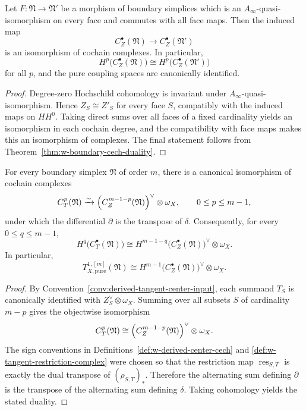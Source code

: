 \begin{lemma}
\label{lem:w-boundary-simplex-homotopy-invariance}
Let $F\colon \mathfrak N\to \mathfrak N'$ be a morphism of boundary simplices which is an
$A_\infty$-quasi-isomorphism on every face and commutes with all face maps. Then the induced map
\[
C_Z^\bullet(\mathfrak N)\longrightarrow C_Z^\bullet(\mathfrak N')
\]
is an isomorphism of cochain complexes. In particular,
\[
H^p\bigl(C_Z^\bullet(\mathfrak N)\bigr)
\cong
H^p\bigl(C_Z^\bullet(\mathfrak N')\bigr)
\]
for all $p$, and the pure coupling spaces are canonically identified.
\end{lemma}

\begin{proof}
Degree-zero Hochschild cohomology is invariant under $A_\infty$-quasi-isomorphism. Hence
$Z_S\cong Z'_S$ for every face $S$, compatibly with the induced maps on $HH^0$. Taking direct sums over all faces of a fixed cardinality yields an isomorphism in each cochain degree, and the compatibility with face maps makes this an isomorphism of complexes. The final statement follows from Theorem~\ref{thm:w-boundary-cech-duality}.
\end{proof}

\begin{theorem}
\label{thm:w-boundary-cech-duality}
For every boundary simplex $\mathfrak N$ of order $m$, there is a canonical isomorphism of cochain complexes
\[
C_T^p(\mathfrak N)
\xrightarrow{\sim}
\Bigl(C_Z^{m-1-p}(\mathfrak N)\Bigr)^\vee\otimes \omega_X,
\qquad 0\le p\le m-1,
\]
under which the differential $\partial$ is the transpose of $\delta$.
Consequently, for every $0\le q\le m-1$,
\[
H^q\bigl(C_T^\bullet(\mathfrak N)\bigr)
\cong
H^{m-1-q}\bigl(C_Z^\bullet(\mathfrak N)\bigr)^\vee\otimes \omega_X.
\]
In particular,
\[
T^{1,[m]}_{X,\mathrm{pure}}(\mathfrak N)
\cong
H^{m-1}\bigl(C_Z^\bullet(\mathfrak N)\bigr)^\vee\otimes \omega_X.
\]
\end{theorem}

\begin{proof}
By Convention~\ref{conv:derived-tangent-center-input}, each summand $T_S$ is canonically
identified with $Z_S^\vee\otimes \omega_X$. Summing over all subsets $S$ of cardinality $m-p$
gives the objectwise isomorphism
\[
C_T^p(\mathfrak N)
\cong
\Bigl(C_Z^{m-1-p}(\mathfrak N)\Bigr)^\vee\otimes \omega_X.
\]
The sign conventions in Definitions~\ref{def:w-derived-center-cech} and
\ref{def:w-tangent-restriction-complex} were chosen so that the restriction map
$\operatorname{res}_{S,T}$ is exactly the dual transpose of $(\rho_{S,T})_*$. Therefore the alternating
sum defining $\partial$ is the transpose of the alternating sum defining $\delta$.
Taking cohomology yields the stated duality.
\end{proof}

